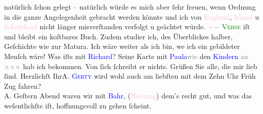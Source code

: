                natürlich ſchon gelegt – natürlich würde es mich aber {\pb}ſehr freuen, wenn Ordnung in die ganze Angelegenheit gebracht werden könnte und ich
               von \textcolor{pink}{England}{}\ledrightnote{\textcolor{pink}{England}}, \textcolor{pink}{Irland}{}\ledrightnote{\textcolor{pink}{Irland}}
               u \textcolor{pink}{Schottland}{}\ledrightnote{\textcolor{pink}{Schottland}} nicht länger misverſtanden \introOben{}verfolgt u geächtet\introOben{} würde. –\pend
           \pstart
           – \textsc{\textcolor{green}{Vehse}{}} iſt und bleibt ein koſtbares Buch. Zudem studier ich, des Überblickes halber,
               Geſchichte \introOben{}wie\introOben{} zur Matura. Ich wäre weiter als ich bin, we{\geminationn} ich ein gebildeter Menſch wäre!\pend
           \pstart
           Was iſts mit \textcolor{blue}{Richard}{}\ledrightnote{\textcolor{blue}{Richard Beer-Hofmann}}? Seine Karte mit \textcolor{blue}{Paula}{}\ledrightnote{\textcolor{blue}{Paula Beer-Hofmann}}{ }\textcolor{gray}{wie} den \textcolor{gray}{\textcolor{blue}{Kindern}{}}{ }\textcolor{gray}{an}{ }\textcolor{gray}{×}\-\textcolor{gray}{×}\-\textcolor{gray}{×} hab ich bekommen. Von ſich
               ſchreibt er nichts. Grüßen Sie alle, die mir lieb ſind.\pend
           \pstart Herzlichſt Ihr\spacefill\mbox{A.{\pb}}\pend{}\pstart
           \noindent{}{\pb}\textsc{\textcolor{blue}{Gerty}{}\ledrightnote{\textcolor{blue}{Gertrude von Hofmannsthal}}} wird wohl auch am liebſten mit dem Zehn Uhr Früh Zug fahren?{\\}A.\pend
           \pstart
           Geſtern Abend waren wir mit \textcolor{blue}{Bahr}{}\ledrightnote{\textcolor{blue}{Hermann Bahr}}, (\textcolor{pink}{Hietzing}{}\ledrightnote{\textcolor{pink}{XIII., Hietzing}}) dem’s recht gut, und was das
                  weſentlichſte iſt, hoffnungsvoll zu gehen ſcheint.\pend
           \endnumbering{}  
      